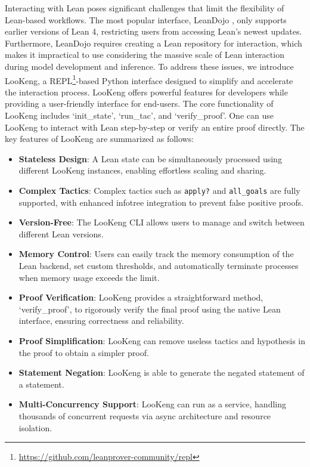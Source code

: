 Interacting with Lean poses significant challenges that limit the flexibility of Lean-based workflows. 
The most popular interface, LeanDojo \citep{yang2023Leandojo}, only supports earlier versions of Lean 4, restricting users from accessing Lean's newest updates.
Furthermore, LeanDojo requires creating a Lean repository for interaction, which makes it impractical to use considering the massive scale of Lean interaction during model development and inference.
To address these issues, we introduce LooKeng, a REPL\footnote{\href{https://github.com/leanprover-community/repl}{https://github.com/leanprover-community/repl}}-based Python interface designed to simplify and accelerate the interaction process. 
LooKeng offers powerful features for developers while providing a user-friendly interface for end-users.
The core functionality of LooKeng includes `init\_state', `run\_tac', and `verify\_proof'. One can use LooKeng to interact with Lean step-by-step or verify an entire proof directly.
The key features of LooKeng are summarized as follows:
\begin{itemize}
    \item \textbf{Stateless Design}: A Lean state can be simultaneously processed using different LooKeng instances, enabling effortless scaling and sharing.
    
    \item \textbf{Complex Tactics}: Complex tactics such as \texttt{apply?} and \texttt{all\_goals} are fully supported, with enhanced infotree integration to prevent false positive proofs.

    \item \textbf{Version-Free}: The LooKeng CLI allows users to manage and switch between different Lean versions. 
    
    \item \textbf{Memory Control}: Users can easily track the memory consumption of the Lean backend, set custom thresholds, and automatically terminate processes when memory usage exceeds the limit.

     \item \textbf{Proof Verification}: LooKeng provides a straightforward method, `verify\_proof', to rigorously verify the final proof using the native Lean interface, ensuring correctness and reliability.

     \item \textbf{Proof Simplification}: LooKeng can remove useless tactics and hypothesis in the proof to obtain a simpler proof.

     \item \textbf{Statement Negation}: LooKeng is able to generate the negated statement of a statement.

     \item \textbf{Multi-Concurrency Support}: LooKeng can run as a service, handling thousands of concurrent requests via async architecture and resource isolation.

\end{itemize}


